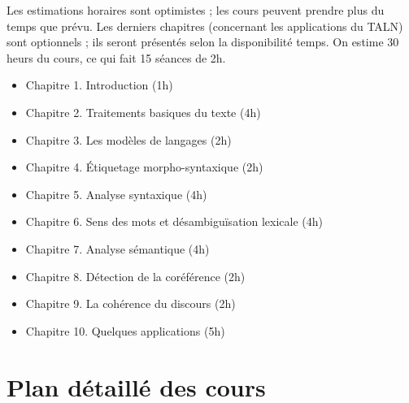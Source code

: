\documentclass[11pt, a4paper]{article}
\begin{document}
Les estimations horaires sont optimistes ; les cours peuvent prendre plus du temps que prévu. 
Les derniers chapitres (concernant les applications du TALN) sont optionnels ; ils seront présentés selon la disponibilité temps. On estime 30 heurs du cours, ce qui fait 15 séances de 2h. 

\begin{itemize}
	\item Chapitre 1. Introduction (1h)
	\item Chapitre 2. Traitements basiques du texte (4h)
	\item Chapitre 3. Les modèles de langages (2h)
	\item Chapitre 4. Étiquetage morpho-syntaxique (2h)
	\item Chapitre 5. Analyse syntaxique (4h)
	\item Chapitre 6. Sens des mots et désambiguïsation lexicale (4h)
	\item Chapitre 7. Analyse sémantique (4h)
	\item Chapitre 8. Détection de la coréférence (2h)
	\item Chapitre 9. La cohérence du discours (2h)
	\item Chapitre 10. Quelques applications (5h)
\end{itemize}


\section{Plan détaillé des cours}
\end{document}
